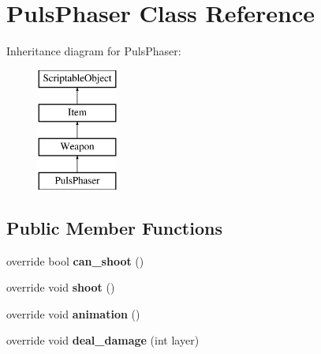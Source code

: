\hypertarget{class_puls_phaser}{}\section{Puls\+Phaser Class Reference}
\label{class_puls_phaser}
Inheritance diagram for Puls\+Phaser\+:\begin{figure}[H]
\begin{center}
\leavevmode
\includegraphics[height=4.000000cm]{class_puls_phaser}
\end{center}
\end{figure}
\subsection*{Public Member Functions}
\begin{DoxyCompactItemize}
\item 
\mbox{\label{class_puls_phaser_a9cefce37a960081cf96620952792cd0d}} 
override bool {\bfseries can\+\_\+shoot} ()
\item 
\mbox{\label{class_puls_phaser_ad6e860eb4808d833ef314a4cc012e02e}} 
override void {\bfseries shoot} ()
\item 
\mbox{\label{class_puls_phaser_aef7ade6c674edf931cf5fd00262d3b6d}} 
override void {\bfseries animation} ()
\item 
\mbox{\label{class_puls_phaser_a95cfb2398e2e6fc217833c0e0845ee98}} 
override void {\bfseries deal\+\_\+damage} (int layer)
\end{DoxyCompactItemize}
